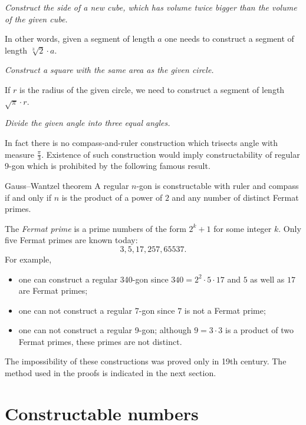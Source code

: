  {\it Construct the side of a new cube, 
which has volume twice bigger than the volume of the given cube.} 

\medskip

In other words, 
given a segment of length $a$
one needs to construct a segment of length $\sqrt[3]{2}\cdot a$.

 {\it Construct a square with the same area as the given circle.} 

\medskip

If $r$ is the radius of the given circle, we need to construct a segment of length $\sqrt{\pi}\cdot r$. 

{\it Divide the given angle into three equal angles.}

\medskip

In fact there is no compass-and-ruler construction which trisects angle with measure $\tfrac\pi3$. 
Existence of such construction would imply constructability of regular 9-gon which is prohibited by the following famous result.

\begin{thm}{Gauss--Wantzel theorem}
A regular $n$-gon is constructable with ruler and compass 
if and only if 
$n$ is the product of a power of $2$ and any number of distinct Fermat primes.
\end{thm}

The \emph{Fermat prime} is a prime numbers of the form $2^k+1$ for some integer $k$.
Only five Fermat primes are known  today:
$$3, 5, 17, 257, 65537.$$
For example, 
\begin{itemize}
\item one can construct a regular 340-gon since $340=2^2\cdot 5\cdot 17$ and $5$ as well as $17$ are Fermat primes;
\item one can not construct a regular 7-gon since $7$ is not a Fermat prime;
\item one can not construct a regular 9-gon; although $9=3\cdot 3$ is a product of two Fermat primes, these primes are not distinct.
\end{itemize}

\medskip

The impossibility of these constructions 
was proved only in 19th century.
The method used in the proofs is indicated in the next section.

\section*{Constructable numbers}

